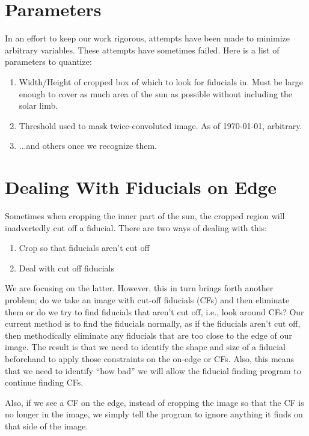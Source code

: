 \documentclass[10pt]{article}
\begin{document}
\section{Parameters}
    In an effort to keep our work rigorous, attempts have been made to minimize arbitrary variables. These attempts have sometimes failed. Here is a list of parameters to quantize:
    \begin{enumerate}
        \item Width/Height of cropped box of which to look for fiducials in. Must be large enough to cover as much area of the sun as possible without including the solar limb.
        \item Threshold used to mask twice-convoluted image. As of \today, arbitrary.
        \item ...and others once we recognize them.
    \end{enumerate}

\section{Dealing With Fiducials on Edge} %
\label{sec:dealing_witb_fiducials_on_edge}
    Sometimes when cropping the inner part of the sun, the cropped region will inadvertedly cut off a fiducial. There are two ways of dealing with this:

    \begin{enumerate}
         \item Crop so that fiducials aren't cut off
         \item Deal with cut off fiducials
     \end{enumerate} 

     We are focusing on the latter. However, this in turn brings forth another problem; do we take an image with cut-off fiducials (CFs) and then eliminate them or do we try to find fiducials that aren't cut off, i.e., look around CFs? Our current method is to find the fiducials normally, as if the fiducials aren't cut off, then methodically eliminate any fiducials that are too close to the edge of our image. The result is that we need to identify the shape and size of a fiducial beforehand to apply those constraints on the on-edge or CFs. Also, this means that we need to identify ``how bad'' we will allow the fiducial finding program to continue finding CFs.

     Also, if we see a CF on the edge, instead of cropping the image so that the CF is no longer in the image, we simply tell the program to ignore anything it finds on that side of the image. 
\end{document}
